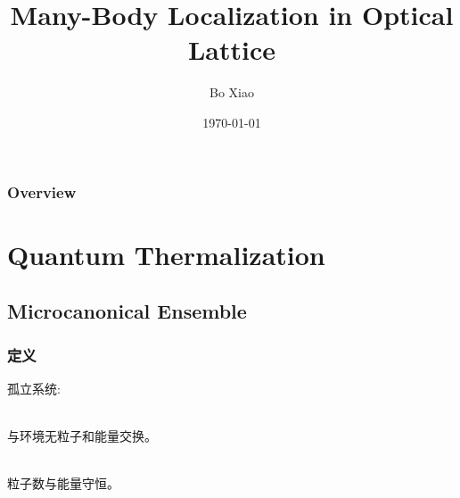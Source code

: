 \documentclass{beamer}
\title{Many-Body Localization in Optical Lattice} %
\author{Bo Xiao} %
\institute[USTC] %
{
University of Science and Technology of China \\ %
\medskip
\textit{xbustc@gmail.com} %
}
\date{\today} %
\begin{document}
\noindent
\begin{frame}
\titlepage %
\end{frame}

\begin{frame}
\frametitle{Overview} %
\tableofcontents %
\end{frame}


\section{Quantum Thermalization} %

\subsection{Microcanonical Ensemble} %

\begin{frame}
\frametitle{定义}
孤立系统:\\~

\pause 与环境无粒子和能量交换。\\~

\pause 粒子数与能量守恒。

\end{frame}
\end{document}
